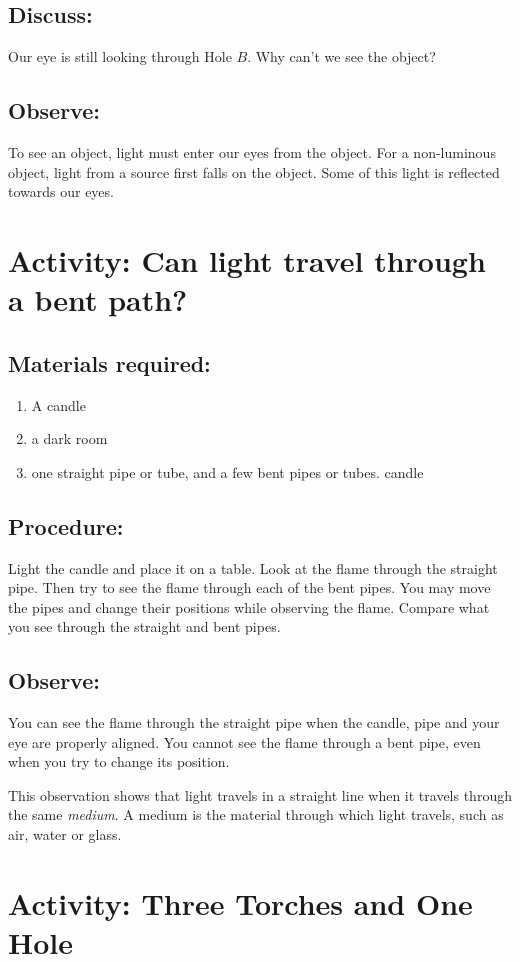 \documentclass{xtufte-handout}
\begin{document}
\subsection{Discuss:} Our eye is still looking through Hole $B$. Why can't we see the object?
\subsection{Observe:} To see an object, light must enter our eyes from the object. For a non-luminous object, light from a source first falls on the object. Some of this light is reflected towards our eyes.

\section{Activity: Can light travel through a bent path?}
\subsection{Materials required:}
\begin{enumerate}
    \item A candle
    \item a dark room
    \item one straight pipe or tube, and a few bent pipes or tubes.
candle
\end{enumerate}
\subsection{Procedure:} Light the candle and place it on a table. Look at the flame through the straight pipe. Then try to see the flame through each of the bent pipes. You may move the pipes and change their positions while observing the flame. Compare what you see through the straight and bent pipes.
\subsection{Observe:} You can see the flame through the straight pipe when the candle, pipe and your eye are properly aligned. You cannot see the flame through a bent pipe, even when you try to change its position.

This observation shows that light travels in a straight line when it travels through the same \emph{medium}. A medium is the material through which light travels, such as air, water or glass.

\section{Activity: Three Torches and One Hole}
\end{document}
